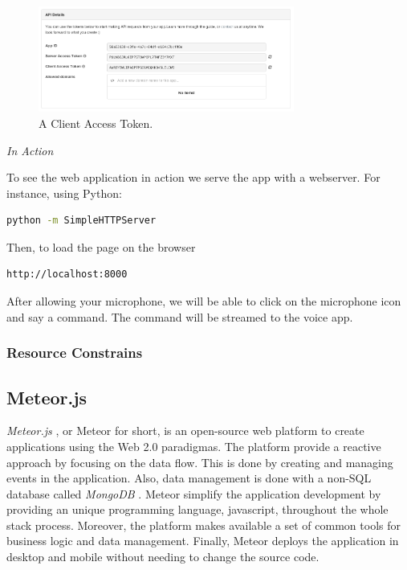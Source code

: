 \begin{figure}[!h]
\begin{center}
    \includegraphics[width=0.75\textwidth]{figures/token.png}
    \caption{A Client Access Token.}
    \label{fig:token}
\end{center}
\end{figure}


\emph{In Action}

To see the web application in action we serve the app with a webserver.
For instance, using Python:
\begin{lstlisting}[language=bash]
	python -m SimpleHTTPServer
\end{lstlisting}
Then, to load the page on the browser
\begin{lstlisting}[language=bash]
	http://localhost:8000
\end{lstlisting}



After allowing your microphone, we will be able to click on the microphone icon and say a command. 
The command will be streamed to the voice app.


\subsubsection{Resource Constrains}



\subsection{Meteor.js}

\emph{Meteor.js} \cite{meteor}, or Meteor for short, is an open-source web platform to create applications using the Web 2.0 paradigmas.
The platform provide a reactive approach by focusing on the data flow.
This is done by creating and managing events in the application.
Also, data management is done with a non-SQL database called \emph{MongoDB} \cite{mongo}.
Meteor simplify the application development by providing an unique programming language, javascript, throughout the whole stack process.
Moreover, the platform makes available a set of common tools for business logic and data management.
Finally, Meteor deploys the application in desktop and mobile without needing to change the source code.

